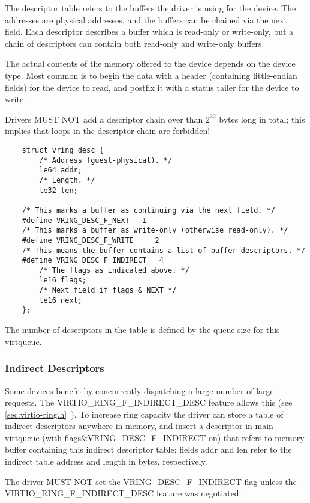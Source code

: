The descriptor table refers to the buffers the driver is using for
the device. The addresses are physical addresses, and the buffers
can be chained via the next field. Each descriptor describes a
buffer which is read-only or write-only, but a chain of
descriptors can contain both read-only and write-only buffers.

The actual contents of the memory offered to the device depends on the
device type.  Most common is to begin the data with a header
(containing little-endian fields) for the device to read, and postfix
it with a status tailer for the device to write.

Drivers MUST NOT add a descriptor chain over than $2^{32}$ bytes long in total;
this implies that loops in the descriptor chain are forbidden!

\begin{lstlisting}
	struct vring_desc {
		/* Address (guest-physical). */
		le64 addr;
		/* Length. */
		le32 len;

	/* This marks a buffer as continuing via the next field. */
	#define VRING_DESC_F_NEXT   1
	/* This marks a buffer as write-only (otherwise read-only). */
	#define VRING_DESC_F_WRITE     2
	/* This means the buffer contains a list of buffer descriptors. */
	#define VRING_DESC_F_INDIRECT   4
		/* The flags as indicated above. */
		le16 flags;
		/* Next field if flags & NEXT */
		le16 next;
	};
\end{lstlisting}

The number of descriptors in the table is defined by the queue size
for this virtqueue.

\subsubsection{Indirect Descriptors}\label{sec:Basic Facilities of a Virtio Device / Virtqueues / The Virtqueue Descriptor Table / Indirect Descriptors}

Some devices benefit by concurrently dispatching a large number
of large requests. The VIRTIO_RING_F_INDIRECT_DESC feature allows this (see \ref{sec:virtio-ring.h}~). To increase
ring capacity the driver can store a table of indirect
descriptors anywhere in memory, and insert a descriptor in main
virtqueue (with flags\&VRING_DESC_F_INDIRECT on) that refers to memory buffer
containing this indirect descriptor table; fields addr and len
refer to the indirect table address and length in bytes,
respectively.

The driver MUST NOT set the VRING_DESC_F_INDIRECT flag unless the
VIRTIO_RING_F_INDIRECT_DESC feature was negotiated.

